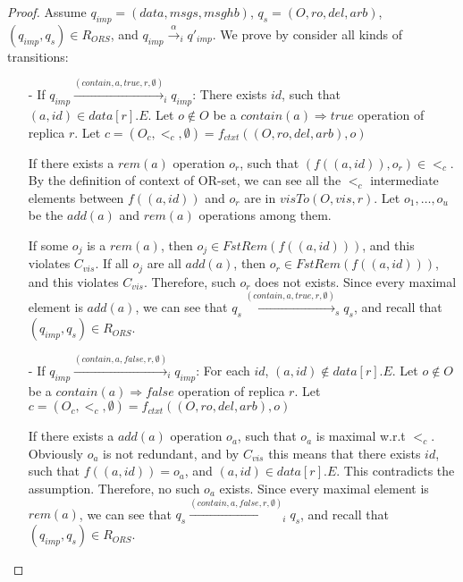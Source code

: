 \begin {proof}

Assume $q_{\mathit{imp}} = (\mathit{data},\mathit{msgs},\mathit{msghb})$, $q_s = (O,\mathit{ro},\mathit{del},\mathit{arb})$, $(q_{\mathit{imp}},q_s) \in R_{\mathit{ORS}}$, and $q_{\mathit{imp}} \xrightarrow{\alpha}_i q'_{\mathit{imp}}$. We prove by consider all kinds of transitions:

\begin{itemize}
\setlength{\itemsep}{0.5pt}
\item[-] If $q_{\mathit{imp}} \xrightarrow{( \mathit{contain},a,\mathit{true},r,\emptyset )}_i q_{\mathit{imp}}$: There exists $\mathit{id}$, such that $(a,id) \in \mathit{data}[r].E$. Let $o \notin O$ be a $\mathit{contain}(a) \Rightarrow \mathit{true}$ operation of replica $r$. Let $c = (O_c,<_c,\emptyset) = f_{\mathit{ctxt}}((O,\mathit{ro},\mathit{del},\mathit{arb}),o)$

If there exists a $\mathit{rem}(a)$ operation $o_r$, such that $(f((a,\mathit{id})),o_r) \in <_c$. By the definition of context of OR-set, we can see all the $<_c$ intermediate elements between $f((a,\mathit{id}))$ and $o_r$ are in $\mathit{visTo}(O,\mathit{vis},r)$. Let $o_1,\ldots,o_u$ be the $\mathit{add}(a)$ and $\mathit{rem}(a)$ operations among them.

If some $o_j$ is a $\mathit{rem}(a)$, then $o_j \in \mathit{FstRem}( f((a,\mathit{id})) )$, and this violates $C_{\mathit{vis}}$. If all $o_j$ are all $\mathit{add}(a)$, then $o_r \in \mathit{FstRem}( f((a,\mathit{id})) )$, and this violates $C_{\mathit{vis}}$. Therefore, such $o_r$ does not exists. Since every maximal element is $\mathit{add}(a)$, we can see that $q_s \xrightarrow{( \mathit{contain},a,\mathit{true},r,\emptyset )}_s q_s$, and recall that $(q_{\mathit{imp}},q_s) \in R_{\mathit{ORS}}$.

\item[-] If $q_{\mathit{imp}} \xrightarrow{( \mathit{contain},a,\mathit{false},r,\emptyset )}_i q_{\mathit{imp}}$: For each $\mathit{id}$, $(a,id) \notin \mathit{data}[r].E$. Let $o \notin O$ be a $\mathit{contain}(a) \Rightarrow \mathit{false}$ operation of replica $r$. Let $c = (O_c,<_c,\emptyset) = f_{\mathit{ctxt}}((O,\mathit{ro},\mathit{del},\mathit{arb}),o)$

If there exists a $\mathit{add}(a)$ operation $o_a$, such that $o_a$ is maximal w.r.t $<_c$. Obviously $o_a$ is not redundant, and by $C_{\mathit{vis}}$ this means that there exists $\mathit{id}$, such that $f((a,\mathit{id})) = o_a$, and $(a,\mathit{id}) \in \mathit{data}[r].E$. This contradicts the assumption. Therefore, no such $o_a$ exists. Since every  maximal element is $\mathit{rem}(a)$, we can see that $q_s \xrightarrow{( \mathit{contain},a,\mathit{false},r,\emptyset )}_i q_s$, and recall that $(q_{\mathit{imp}},q_s) \in R_{\mathit{ORS}}$.


\end{itemize}
\end{proof}

